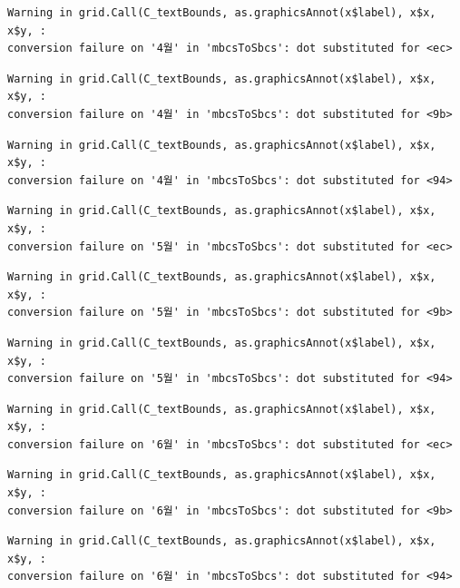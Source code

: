 \documentclass[
  letterpaper,
  DIV=11,
  numbers=noendperiod]{scrreprt}
\begin{document}
\begin{verbatim}
Warning in grid.Call(C_textBounds, as.graphicsAnnot(x$label), x$x, x$y, :
conversion failure on '4월' in 'mbcsToSbcs': dot substituted for <ec>
\end{verbatim}

\begin{verbatim}
Warning in grid.Call(C_textBounds, as.graphicsAnnot(x$label), x$x, x$y, :
conversion failure on '4월' in 'mbcsToSbcs': dot substituted for <9b>
\end{verbatim}

\begin{verbatim}
Warning in grid.Call(C_textBounds, as.graphicsAnnot(x$label), x$x, x$y, :
conversion failure on '4월' in 'mbcsToSbcs': dot substituted for <94>
\end{verbatim}

\begin{verbatim}
Warning in grid.Call(C_textBounds, as.graphicsAnnot(x$label), x$x, x$y, :
conversion failure on '5월' in 'mbcsToSbcs': dot substituted for <ec>
\end{verbatim}

\begin{verbatim}
Warning in grid.Call(C_textBounds, as.graphicsAnnot(x$label), x$x, x$y, :
conversion failure on '5월' in 'mbcsToSbcs': dot substituted for <9b>
\end{verbatim}

\begin{verbatim}
Warning in grid.Call(C_textBounds, as.graphicsAnnot(x$label), x$x, x$y, :
conversion failure on '5월' in 'mbcsToSbcs': dot substituted for <94>
\end{verbatim}

\begin{verbatim}
Warning in grid.Call(C_textBounds, as.graphicsAnnot(x$label), x$x, x$y, :
conversion failure on '6월' in 'mbcsToSbcs': dot substituted for <ec>
\end{verbatim}

\begin{verbatim}
Warning in grid.Call(C_textBounds, as.graphicsAnnot(x$label), x$x, x$y, :
conversion failure on '6월' in 'mbcsToSbcs': dot substituted for <9b>
\end{verbatim}

\begin{verbatim}
Warning in grid.Call(C_textBounds, as.graphicsAnnot(x$label), x$x, x$y, :
conversion failure on '6월' in 'mbcsToSbcs': dot substituted for <94>
\end{verbatim}
\end{document}
